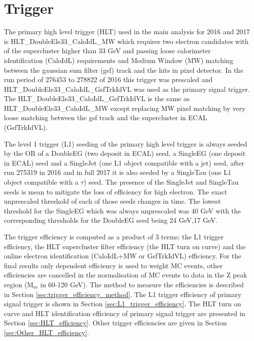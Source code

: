 \section{Trigger}\label{sec:Zprime_trigger}
The primary high level trigger (HLT) used in the main analysis for 2016 and 2017 is HLT\_DoubleEle33\_CaloIdL\_MW which requires two electron candidates with \et of the supercluster higher than 33 GeV and passing loose calorimeter identification (CaloIdL) requirements and Medium Window (MW) matching between the gaussian sum filter (gsf) \cite{0954-3899-31-9-N01} track and the hits in pixel detector. In the run period of 276453 to 278822 of 2016 this trigger was prescaled and HLT\_DoubleEle33\_CaloIdL\_GsfTrkIdVL was used as the primary signal trigger. The HLT\_DoubleEle33\_CaloIdL\_GsfTrkIdVL is the same as HLT\_DoubleEle33\_CaloIdL\_MW except replacing MW pixel matching by very loose matching between the gsf track and the supercluster in ECAL (GsfTrkIdVL).

The level 1 trigger (L1) seeding of the primary high level trigger is always seeded by the OR of a DoubleEG (two deposit in ECAL) seed, a SingleEG (one deposit in ECAL) seed and a SingleJet (one L1 object compatible with a jet) seed, after run 275319 in 2016 and in full 2017 it is also seeded by a SingleTau (one L1 object compatible with a $\tau$) seed. The presence of the SingleJet and SingleTau seeds is mean to mitigate the loss of efficiency for high \et electron. The exact unprescaled threshold of each of those seeds changes in time. The lowest threshold for the SingleEG which was always unprescaled was 40 GeV with the corresponding thresholds for the DoubleEG seed being 24 GeV,17 GeV.

The trigger efficiency is computed as a product of 3 terms: the L1 trigger efficiency, the HLT supercluster \et filter efficiency (the HLT turn on curve) and the online electron identification (CaloIdL+MW or GsfTrkIdVL) efficiency. For the final results only \et dependent efficiency is used to weight MC events, other efficiencies are cancelled in the normalisation of MC events to data in the Z peak region ($\mathrm{M_{ee}}$ in 60-120 GeV). The method to measure the efficiencies is  described in Section \ref{sec:trigger_efficiency_method}. The L1 trigger efficiency of primary signal trigger is shown in Section \ref{sec:L1_trigger_efficiency}. The HLT \et turn on curve and HLT identification efficiency of primary signal trigger are presented in Section \ref{sec:HLT_efficiency}. Other trigger efficiencies are given in Section \ref{sec:Other_HLT_efficiency}.

